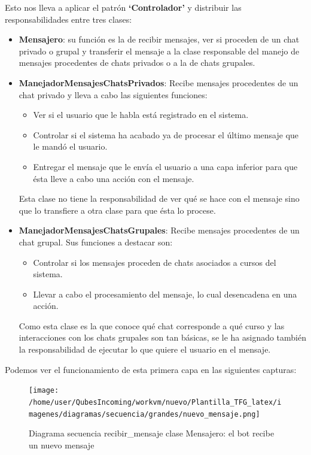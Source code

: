 Esto nos lleva a aplicar el patrón \textbf{\enquote*{Controlador}} y distribuir las responsabilidades entre tres clases:
\begin{itemize}
\item \textbf{Mensajero}: su función es la de recibir mensajes, ver si proceden de un chat privado o grupal y transferir el mensaje a la clase responsable del manejo de mensajes procedentes de chats privados o a la de chats grupales.
\item \textbf{ManejadorMensajesChatsPrivados}: Recibe mensajes procedentes de un chat privado y lleva a cabo las siguientes funciones:
\begin{itemize}
\item Ver si el usuario que le habla está registrado en el sistema.
\item Controlar si el sistema ha acabado ya de procesar el último mensaje que le mandó el usuario.
\item Entregar el mensaje que le envía el usuario a una capa inferior para que ésta lleve a cabo una acción con el mensaje.
\end{itemize}
Esta clase no tiene la responsabilidad de ver qué se hace con el mensaje sino que lo transfiere a otra clase para que ésta lo procese.
\item \textbf{ManejadorMensajesChatsGrupales}: Recibe mensajes procedentes de un chat grupal. Sus funciones a destacar son:
\begin{itemize}
\item Controlar si los mensajes proceden de chats asociados a cursos del sistema.
\item Llevar a cabo el procesamiento del mensaje, lo cual desencadena en una acción.
\end{itemize}
Como  esta clase es la que conoce qué chat corresponde a qué curso y las interacciones con los chats grupales son tan básicas, se le ha asignado también la responsabilidad de ejecutar lo que quiere el usuario en el mensaje.
\end{itemize}

Podemos ver el funcionamiento de esta primera capa en las siguientes capturas:
\begin{figure}[H] %
\centering
\texttt{[image: /home/user/QubesIncoming/workvm/nuevo/Plantilla\_TFG\_latex/imagenes/diagramas/secuencia/grandes/nuevo\_mensaje.png]}  %

\caption{Diagrama secuencia recibir\_mensaje clase  Mensajero: el bot recibe un nuevo mensaje}\label{figura220}
\end{figure}

